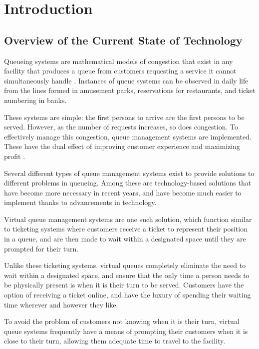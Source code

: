 \chapter{Introduction}
\label{sec:researchdesc}    %

\section{Overview of the Current State of Technology}
\label{sec:overview}

Queueing systems are mathematical models of congestion that exist in any facility that produces a queue from customers requesting a service it cannot simultaneously handle \cite{Armero2001,Srivasta2003}. Instances of queue systems can be observed in daily life from the lines formed in amusement parks, reservations for restaurants, and ticket numbering in banks.

These systems are simple: the first persons to arrive are the first persons to be served. However, as the number of requests increases, so does congestion. To effectively manage this congestion, queue management systems are implemented. These have the dual effect of improving customer experience and maximizing profit \cite{TamisCorp2013}. 

Several different types of queue management systems exist to provide solutions to different problems in queueing. Among these are technology-based solutions that have become more necessary in recent years, and have become much easier to implement thanks to advancements in technology. 

Virtual queue management systems are one such solution, which function similar to ticketing systems where customers receive a ticket to represent their position in a queue, and are then made to wait within a designated space until they are prompted for their turn. 

Unlike these ticketing systems, virtual queues completely eliminate the need to wait within a designated space, and ensure that the only time a person needs to be physically present is when it is their turn to be served. Customers have the option of receiving a ticket online, and have the luxury of spending their waiting time wherever and however they like. 

To avoid the problem of customers not knowing when it is their turn, virtual queue systems frequently have a means of prompting their customers when it is close to their turn, allowing them adequate time to travel to the facility. 


